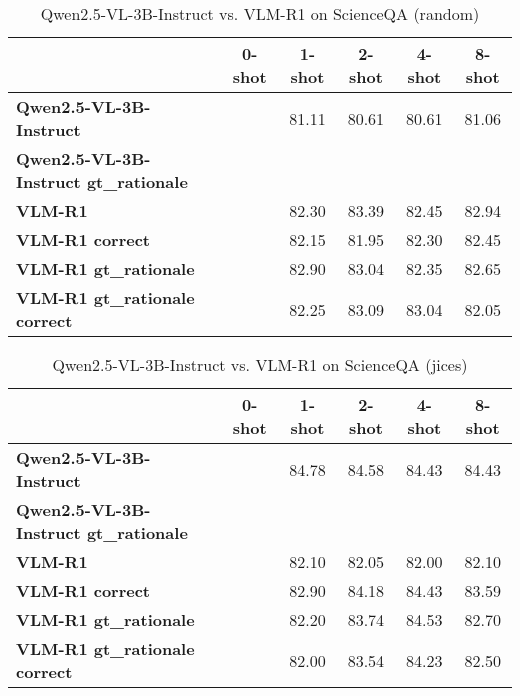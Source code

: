 \begin{table}
\caption{Qwen2.5-VL-3B-Instruct vs. VLM-R1 on ScienceQA (random)}
\label{tab:Qwen2.5-VL-3B-Instruct_ScienceQA_TRAIN_random}
\begin{tabular}{lccccc}
\toprule
 & 0-shot & 1-shot & 2-shot & 4-shot & 8-shot \\
\midrule
\textbf{Qwen2.5-VL-3B-Instruct} &  & 81.11 & 80.61 & 80.61 & 81.06 \\
\textbf{Qwen2.5-VL-3B-Instruct gt\_rationale} &  &  &  &  &  \\
\textbf{VLM-R1} &  & 82.30 & 83.39 & 82.45 & 82.94 \\
\textbf{VLM-R1 correct} &  & 82.15 & 81.95 & 82.30 & 82.45 \\
\textbf{VLM-R1 gt\_rationale} &  & 82.90 & 83.04 & 82.35 & 82.65 \\
\textbf{VLM-R1 gt\_rationale correct} &  & 82.25 & 83.09 & 83.04 & 82.05 \\
\bottomrule
\end{tabular}
\end{table}


\begin{table}
\caption{Qwen2.5-VL-3B-Instruct vs. VLM-R1 on ScienceQA (jices)}
\label{tab:Qwen2.5-VL-3B-Instruct_ScienceQA_TRAIN_jices}
\begin{tabular}{lccccc}
\toprule
 & 0-shot & 1-shot & 2-shot & 4-shot & 8-shot \\
\midrule
\textbf{Qwen2.5-VL-3B-Instruct} &  & 84.78 & 84.58 & 84.43 & 84.43 \\
\textbf{Qwen2.5-VL-3B-Instruct gt\_rationale} &  &  &  &  &  \\
\textbf{VLM-R1} &  & 82.10 & 82.05 & 82.00 & 82.10 \\
\textbf{VLM-R1 correct} &  & 82.90 & 84.18 & 84.43 & 83.59 \\
\textbf{VLM-R1 gt\_rationale} &  & 82.20 & 83.74 & 84.53 & 82.70 \\
\textbf{VLM-R1 gt\_rationale correct} &  & 82.00 & 83.54 & 84.23 & 82.50 \\
\bottomrule
\end{tabular}
\end{table}


